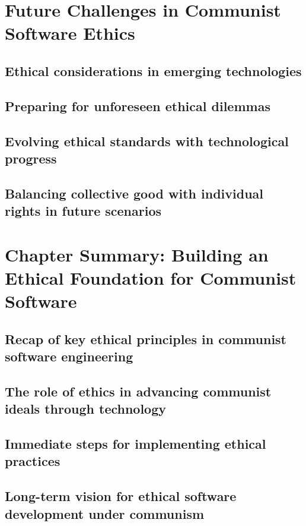 \newpage

\section{Future Challenges in Communist Software Ethics}
\subsection{Ethical considerations in emerging technologies}
\subsection{Preparing for unforeseen ethical dilemmas}
\subsection{Evolving ethical standards with technological progress}
\subsection{Balancing collective good with individual rights in future scenarios}

\newpage

\section{Chapter Summary: Building an Ethical Foundation for Communist Software}
\subsection{Recap of key ethical principles in communist software engineering}
\subsection{The role of ethics in advancing communist ideals through technology}
\subsection{Immediate steps for implementing ethical practices}
\subsection{Long-term vision for ethical software development under communism}
